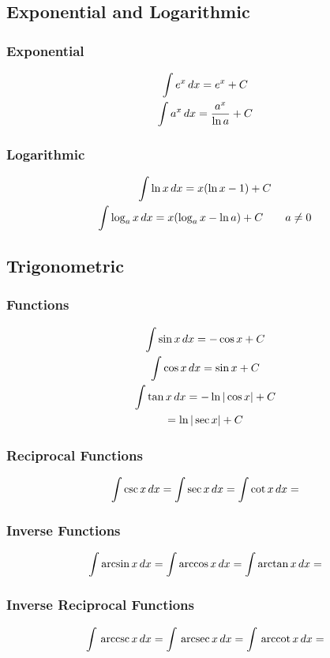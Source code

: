 \documentclass[12pt]{article}
\numberwithin{equation}{subsubsection}
\begin{document}
		\subsection{Exponential and Logarithmic}
			\subsubsection{Exponential}
				\begin{gather}
					\int e^x\,d x = e^x + C \\
					\int a^x\,d x = \frac{a^x}{\ln a} + C
				\end{gather}
			\subsubsection{Logarithmic}
				\begin{gather}
					\int \ln x\,d x = x(\ln x - 1) + C \\
					\int \log_ax\,d x = x(\log_ax - \ln a) +
					C \qquad a \neq 0
				\end{gather}
		\subsection{Trigonometric}
			\subsubsection{Functions}
				\begin{gather}
					\int \sin x\,d x = -\cos x + C \\
					\int \cos x\,d x = \sin x + C \\
					\int \tan x\,d x = -\ln |\cos x| + C \\
					= \ln |\sec x| + C
				\end{gather}
			\subsubsection{Reciprocal Functions}
				\begin{gather}
					\int \csc x\,d x =
					\int \sec x\,d x =
					\int \cot x\,d x =
				\end{gather}
			\subsubsection{Inverse Functions}
				\begin{gather}
					\int \arcsin x\,d x =
					\int \arccos x\,d x =
					\int \arctan x\,d x =
				\end{gather}
			\subsubsection{Inverse Reciprocal Functions}
				\begin{gather}
					\int \,\text{arccsc}\, x\,d x =
					\int \,\text{arcsec}\, x\,d x =
					\int \,\text{arccot}\, x\,d x =
				\end{gather}
\end{document}
